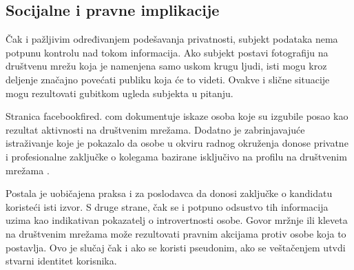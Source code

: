 \documentclass[a4paper]{article}
\begin{document}
\subsection{Socijalne i pravne implikacije}
Čak i pažljivim određivanjem podešavanja privatnosti, subjekt podataka nema potpunu kontrolu nad tokom informacija. Ako subjekt postavi fotografiju na društvenu mrežu koja je namenjena samo uskom krugu ljudi, isti mogu kroz deljenje
značajno povećati publiku koja će to videti. Ovakve i slične situacije mogu rezultovati gubitkom ugleda subjekta u pitanju.\par  Stranica facebookfired. com dokumentuje iskaze osoba koje su izgubile posao kao rezultat aktivnosti na društvenim mrežama. Dodatno je zabrinjavajuće istraživanje koje je pokazalo da
osobe u okviru radnog okruženja donose privatne i profesionalne zaključke o kolegama bazirane isključivo na profilu na društvenim mrežama \cite{Jennifer}. \par Postala je uobičajena praksa i za poslodavca da donosi zaključke o kandidatu koristeći isti izvor. S druge strane, čak se i potpuno odsustvo tih
informacija uzima kao indikativan pokazatelj o introvertnosti osobe. Govor mržnje ili kleveta na društvenim mrežama može rezultovati pravnim akcijama protiv osobe koja to postavlja. 
Ovo je slučaj čak i ako se koristi pseudonim, ako se veštačenjem utvdi stvarni identitet korisnika. 
\newline
\end{document}

